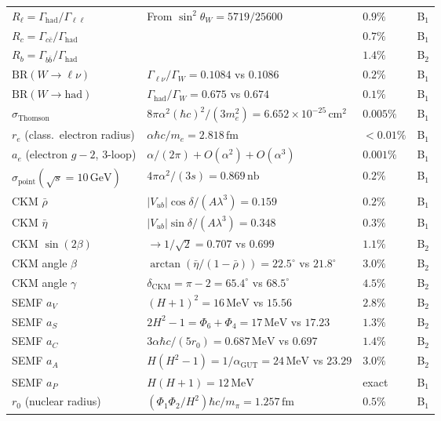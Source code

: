 \documentclass[11pt,a4paper]{article}
\theoremstyle{definition}
\theoremstyle{remark}
\begin{document}
\begin{longtable}{p{3.8cm}p{7.2cm}p{3.0cm}l}
$R_\ell=\Gamma_\mathrm{had}/\Gamma_{\ell\ell}$ & From $\sin^2\theta_W=5719/25600$ & $0.9\%$ & B$_1$ \\
$R_c=\Gamma_{c\bar c}/\Gamma_\mathrm{had}$ & & $0.7\%$ & B$_1$ \\
$R_b=\Gamma_{b\bar b}/\Gamma_\mathrm{had}$ & & $1.4\%$ & B$_2$ \\
$\mathrm{BR}(W\to\ell\nu)$ & $\Gamma_{\ell\nu}/\Gamma_W=0.1084$ vs $0.1086$ & $0.2\%$ & B$_1$ \\
$\mathrm{BR}(W\to\mathrm{had})$ & $\Gamma_\mathrm{had}/\Gamma_W=0.675$ vs $0.674$ & $0.1\%$ & B$_1$ \\
$\sigma_\mathrm{Thomson}$ & $8\pi\alpha^2(\hbar c)^2/(3m_e^2)=6.652\times 10^{-25}\,\mathrm{cm}^2$ & $0.005\%$ & B$_1$ \\
$r_e$ (class.\ electron radius) & $\alpha\hbar c/m_e = 2.818\,\mathrm{fm}$ & $<0.01\%$ & B$_1$ \\
$a_e$ (electron $g\!-\!2$, 3-loop) & $\alpha/(2\pi)+ O(\alpha^2)+O(\alpha^3)$ & $0.001\%$ & B$_1$ \\
$\sigma_\mathrm{point}(\sqrt{s}=10\,\mathrm{GeV})$ & $4\pi\alpha^2/(3s)=0.869\,\mathrm{nb}$ & $0.2\%$ & B$_1$ \\
CKM $\bar\rho$ & $|V_{ub}|\cos\delta/(A\lambda^3)=0.159$ & $0.2\%$ & B$_1$ \\
CKM $\bar\eta$ & $|V_{ub}|\sin\delta/(A\lambda^3)=0.348$ & $0.3\%$ & B$_1$ \\
CKM $\sin(2\beta)$ & $\to 1/\sqrt{2}=0.707$ vs $0.699$ & $1.1\%$ & B$_2$ \\
CKM angle $\beta$ & $\arctan(\bar\eta/(1\!-\!\bar\rho))=22.5^\circ$ vs $21.8^\circ$ & $3.0\%$ & B$_2$ \\
CKM angle $\gamma$ & $\delta_\mathrm{CKM}=\pi-2=65.4^\circ$ vs $68.5^\circ$ & $4.5\%$ & B$_2$ \\
SEMF $a_V$ & $(H+1)^2=16\,\mathrm{MeV}$ vs $15.56$ & $2.8\%$ & B$_2$ \\
SEMF $a_S$ & $2H^2-1=\Phi_6+\Phi_4=17\,\mathrm{MeV}$ vs $17.23$ & $1.3\%$ & B$_2$ \\
SEMF $a_C$ & $3\alpha\hbar c/(5r_0)=0.687\,\mathrm{MeV}$ vs $0.697$ & $1.4\%$ & B$_2$ \\
SEMF $a_A$ & $H(H^2-1)=1/\alpha_\mathrm{GUT}=24\,\mathrm{MeV}$ vs $23.29$ & $3.0\%$ & B$_2$ \\
SEMF $a_P$ & $H(H+1)=12\,\mathrm{MeV}$ & exact & B$_1$ \\
$r_0$ (nuclear radius) & $(\Phi_1\Phi_2/H^2)\hbar c/m_\pi = 1.257\,\mathrm{fm}$ & $0.5\%$ & B$_1$ \\

\end{longtable}
\end{document}
